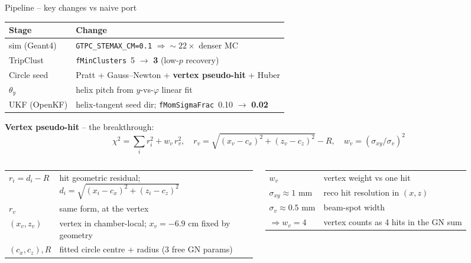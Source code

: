\documentclass[aspectratio=169]{beamer}
\begin{document}
\begin{frame}{Pipeline -- key changes vs naive port}
\small
\begin{tabular}{ll}
\toprule
\textbf{Stage} & \textbf{Change} \\
\midrule
sim (Geant4) & \texttt{GTPC\_STEMAX\_CM=0.1} $\Rightarrow{\sim}22\times$ denser MC \\
TripClust    & \texttt{fMinClusters}\ 5 $\to$ \textbf{3} (low-$p$ recovery) \\
Circle seed  & Pratt + Gauss--Newton + \textbf{vertex pseudo-hit} + Huber \\
$\theta_y$   & helix pitch from $y$-vs-$\varphi$ linear fit \\
UKF (OpenKF) & helix-tangent seed dir; \texttt{fMomSigmaFrac}\ 0.10 $\to$ \textbf{0.02} \\
\bottomrule
\end{tabular}
\vspace{0.4em}

\textbf{Vertex pseudo-hit} -- the breakthrough:
\vspace{-0.3em}
\[
  \chi^2 = \sum_{i} r_i^2 + w_v\, r_v^2,
  \quad
  r_v = \sqrt{(x_v - c_x)^2 + (z_v - c_z)^2} - R,
  \quad
  w_v = (\sigma_{xy}/\sigma_v)^2
\]
\vspace{-0.5em}

\scriptsize
\begin{columns}[t,onlytextwidth]
\begin{tabular}{@{}l p{4.5cm}@{}}
$r_i = d_i - R$ & hit geometric residual; $d_i = \sqrt{(x_i{-}c_x)^2{+}(z_i{-}c_z)^2}$ \\
$r_v$           & same form, at the vertex \\
$(x_v, z_v)$    & vertex in chamber-local; $x_v = -6.9$ cm fixed by geometry \\
$(c_x, c_z), R$ & fitted circle centre + radius (3 free GN params) \\
\end{tabular}
\begin{tabular}{@{}l p{4.0cm}@{}}
$w_v$        & vertex weight vs one hit \\
$\sigma_{xy} \approx 1$ mm & reco hit resolution in $(x,z)$ \\
$\sigma_v \approx 0.5$ mm  & beam-spot width \\
$\Rightarrow w_v = 4$ & vertex counts as 4 hits in the GN sum \\
\end{tabular}
\end{columns}
\end{frame}
\end{document}
